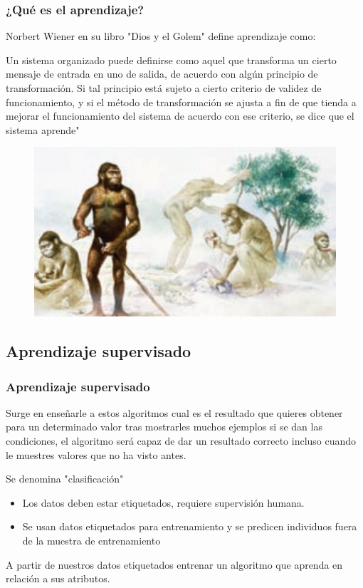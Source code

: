 \documentclass[
	11pt, %
]{beamer}
\begin{document}
\begin{frame}
  \frametitle{¿Qué es el aprendizaje?}

  Norbert Wiener en su libro "Dios y el Golem" define aprendizaje como:
  
  \begin{definition}
    Un sistema organizado puede definirse como aquel que transforma un cierto mensaje de entrada en uno de salida, de acuerdo con algún principio de transformación. Si tal principio está sujeto a cierto criterio de validez de funcionamiento, y si el método de transformación se ajusta a fin de que tienda a mejorar el funcionamiento del sistema de acuerdo con ese criterio, se dice que el sistema aprende"
  \end{definition}

  \begin{figure}
    \includegraphics[width=0.4\linewidth]{homo.jpg}
  \end{figure}
  
\end{frame}


\subsection{Aprendizaje supervisado}
\begin{frame}
  \frametitle{Aprendizaje supervisado}

  Surge en enseñarle a estos algoritmos cual es el resultado que quieres obtener para un determinado valor tras mostrarles muchos ejemplos si se dan las condiciones, el algoritmo será capaz de dar un resultado correcto incluso cuando le muestres valores que no ha visto antes.

  \smallskip %

  Se denomina "clasificación"

  \begin{itemize}
    \item Los datos deben estar etiquetados, requiere supervisión humana.
    \item Se usan datos etiquetados para entrenamiento y se predicen individuos fuera de la muestra de entrenamiento
  \end{itemize}
  
  \smallskip %

  A partir de nuestros datos etiquetados entrenar un algoritmo que aprenda en relación a sus atributos.
    
\end{frame}
\end{document}
